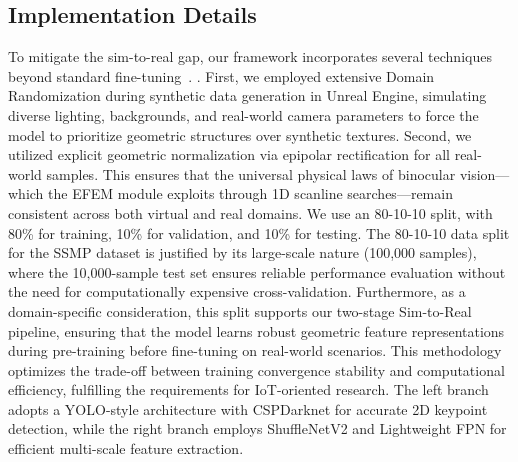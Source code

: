 \documentclass[journal]{IEEEtran}
\begin{document}
\subsection{Implementation Details}
To mitigate the sim-to-real gap, our framework incorporates several techniques beyond standard fine-tuning~. . First, we employed extensive Domain Randomization during synthetic data generation in Unreal Engine, simulating diverse lighting, backgrounds, and real-world camera parameters to force the model to prioritize geometric structures over synthetic textures. Second, we utilized explicit geometric normalization via epipolar rectification for all real-world samples. This ensures that the universal physical laws of binocular vision—which the EFEM module exploits through 1D scanline searches—remain consistent across both virtual and real domains. We use an 80-10-10 split, with 80\% for training, 10\% for validation, and 10\% for testing. The 80-10-10 data split for the SSMP dataset is justified by its large-scale nature (100,000 samples), where the 10,000-sample test set ensures reliable performance evaluation without the need for computationally expensive cross-validation. Furthermore, as a domain-specific consideration, this split supports our two-stage Sim-to-Real pipeline, ensuring that the model learns robust geometric feature representations during pre-training before fine-tuning on real-world scenarios. This methodology optimizes the trade-off between training convergence stability and computational efficiency, fulfilling the requirements for IoT-oriented research. The left branch adopts a YOLO-style architecture with CSPDarknet  for accurate 2D keypoint detection, while the right branch employs ShuffleNetV2  and Lightweight FPN  for efficient multi-scale feature extraction.
\end{document}
